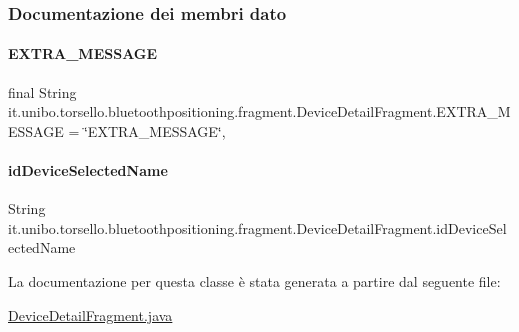 \subsubsection{Documentazione dei membri dato}
\hypertarget{classit_1_1unibo_1_1torsello_1_1bluetoothpositioning_1_1fragment_1_1DeviceDetailFragment_a9f7fff4a2b22105976f2c7223d88f9ae_a9f7fff4a2b22105976f2c7223d88f9ae}{}\label{classit_1_1unibo_1_1torsello_1_1bluetoothpositioning_1_1fragment_1_1DeviceDetailFragment_a9f7fff4a2b22105976f2c7223d88f9ae_a9f7fff4a2b22105976f2c7223d88f9ae} 
\paragraph{\texorpdfstring{E\+X\+T\+R\+A\+\_\+\+M\+E\+S\+S\+A\+GE}{EXTRA\_MESSAGE}}
{\footnotesize\ttfamily final String it.\+unibo.\+torsello.\+bluetoothpositioning.\+fragment.\+Device\+Detail\+Fragment.\+E\+X\+T\+R\+A\+\_\+\+M\+E\+S\+S\+A\+GE = \char`\"{}E\+X\+T\+R\+A\+\_\+\+M\+E\+S\+S\+A\+GE\char`\"{}\hspace{0.3cm}{\ttfamily [static]}, {\ttfamily [private]}}

\hypertarget{classit_1_1unibo_1_1torsello_1_1bluetoothpositioning_1_1fragment_1_1DeviceDetailFragment_a6d52d8371a07fb8da75879758d1d6942_a6d52d8371a07fb8da75879758d1d6942}{}\label{classit_1_1unibo_1_1torsello_1_1bluetoothpositioning_1_1fragment_1_1DeviceDetailFragment_a6d52d8371a07fb8da75879758d1d6942_a6d52d8371a07fb8da75879758d1d6942} 
\paragraph{\texorpdfstring{id\+Device\+Selected\+Name}{idDeviceSelectedName}}
{\footnotesize\ttfamily String it.\+unibo.\+torsello.\+bluetoothpositioning.\+fragment.\+Device\+Detail\+Fragment.\+id\+Device\+Selected\+Name\hspace{0.3cm}{\ttfamily [private]}}



La documentazione per questa classe è stata generata a partire dal seguente file\+:\begin{DoxyCompactItemize}
\item 
\hyperlink{DeviceDetailFragment_8java}{Device\+Detail\+Fragment.\+java}\end{DoxyCompactItemize}
